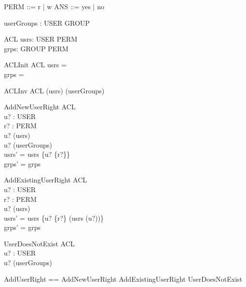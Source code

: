 \begin{zed}
\also
PERM ::= r | w
\also
ANS ::= yes | no 
\end{zed}

\begin{axdef}
userGroups : USER \pfun \power GROUP
\end{axdef}

\begin{schema}{ACL}
usrs: USER \pfun \power PERM \\
grps: GROUP \pfun \power PERM
\end{schema}

\begin{schema}{ACLInit}
ACL
\where
usrs = \emptyset \\
grps = \emptyset
\end{schema}

\begin{schema}{ACLInv}
ACL
\where
\dom (usrs) \subseteq \dom (userGroups)
\end{schema}

\begin{schema}{AddNewUserRight}
\Delta ACL \\
u? : USER \\ 
r? : PERM \\
\where 
u? \notin \dom (usrs) \\
u? \in \dom (userGroups) \\
usrs' = usrs \oplus \{u? \mapsto \{r?\}\} \\
grps' = grps
\end{schema}

\begin{schema}{AddExistingUserRight}
\Delta ACL \\
u? : USER \\ 
r? : PERM \\
\where 
u? \in \dom (usrs) \\
usrs' = usrs \oplus \{u? \mapsto \{r?\} \cup (usrs (u?))\} \\
grps' = grps
\end{schema}

\begin{schema}{UserDoesNotExist}
\Xi ACL \\
u? : USER \\
\where 
u? \notin \dom(userGroups)
\end{schema}

\begin{zed}
AddUserRight == AddNewUserRight \lor AddExistingUserRight \lor UserDoesNotExist
\end{zed}

